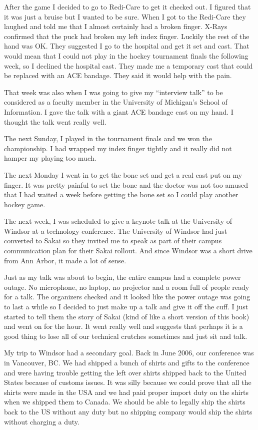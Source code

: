 \documentclass[12pt]{book}
\begin{document}
After the game I decided to go to Redi-Care to get it checked out.   I figured that it
was just a bruise but I wanted to be sure.   When I got to the Redi-Care they laughed
and told me that I almost certainly had a broken finger.  X-Rays confirmed
that the puck had broken my left index finger.  Luckily the rest of the hand was OK.
They suggested I go to the hospital and get it set and cast.  That would mean
that I could not play in the hockey tournament finals the following week, so I declined
the hospital cast.   They made me a temporary cast that could be replaced with an
ACE bandage.   They said it would help with the pain.

That week was also when I was going to give my ``interview talk'' to be considered
as a faculty member in the University of Michigan's School of Information.  I gave the talk
with a giant ACE bandage cast on my hand.   I thought the talk went really well.

The next Sunday, I played in the tournament finals and we won the championship.  I had
wrapped my index finger tightly and it really did not hamper my playing too much.

The next Monday I went in to get the bone set and get a real cast put on my finger.
It was pretty painful to set the bone and the doctor was not too amused
that I had waited a week before getting the bone set so I could play another
hockey game.


The next week, I was scheduled to give a keynote talk at the University of Windsor
at a technology conference.   The University of Windsor had just converted to Sakai
so they invited me to speak as part of their campus communication plan for their
Sakai rollout.  And since Windsor was a short drive from Ann Arbor, it made a lot
of sense.

Just as my talk was about to begin, the entire campus had a complete power outage.
No microphone, no laptop, no projector and a room full of people ready for a talk.
The organizers checked and it looked like the power outage was going to last a while
so I decided to just make up a talk and give it off the cuff.   I just started to
tell them the story of Sakai (kind of like a short version of this book) and went on
for the hour.  It went really well and suggests that perhaps it is a good thing to
lose all of our technical crutches sometimes and just sit and talk.

My trip to Windsor had a secondary goal.  Back in June 2006, our conference was
in Vancouver, BC.   We had shipped a bunch of shirts and gifts to the conference
and were having trouble getting the left over shirts shipped back to the United
States because of customs issues.  It was silly because we could prove that all
the shirts were made in the USA and we had paid proper import duty on the shirts
when we shipped them to Canada.   We should be able to legally ship the shirts back
to the US without any duty but no shipping company would ship the shirts without
charging a duty.
\end{document}
